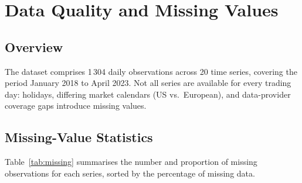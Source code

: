 \section{Data Quality and Missing Values}

\subsection*{Overview}

The dataset comprises 1\,304 daily observations across 20 time series, covering
the period January 2018 to April 2023. Not all series are available for every
trading day: holidays, differing market calendars (US vs.\ European), and
data-provider coverage gaps introduce missing values.

\subsection*{Missing-Value Statistics}

Table~\ref{tab:missing} summarises the number and proportion of missing
observations for each series, sorted by the percentage of missing data.

